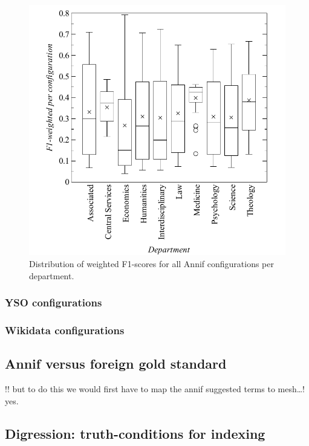 \begin{figure}
\centering
\includegraphics{images/metrics_dept_distribution.pdf}
\caption{Distribution of weighted F1-scores for all Annif configurations
per department.}
\end{figure}

\hypertarget{yso-configurations}{%
\subsubsection{YSO configurations}\label{yso-configurations}}

\hypertarget{wikidata-configurations}{%
\subsubsection{Wikidata configurations}\label{wikidata-configurations}}

\hypertarget{annif-versus-foreign-gold-standard}{%
\subsection{Annif versus foreign gold
standard}\label{annif-versus-foreign-gold-standard}}

!! but to do this we would first have to map the annif suggested terms
to mesh\ldots! yes.

\hypertarget{digression-truth-conditions-for-indexing}{%
\subsection{Digression: truth-conditions for
indexing}\label{digression-truth-conditions-for-indexing}}

